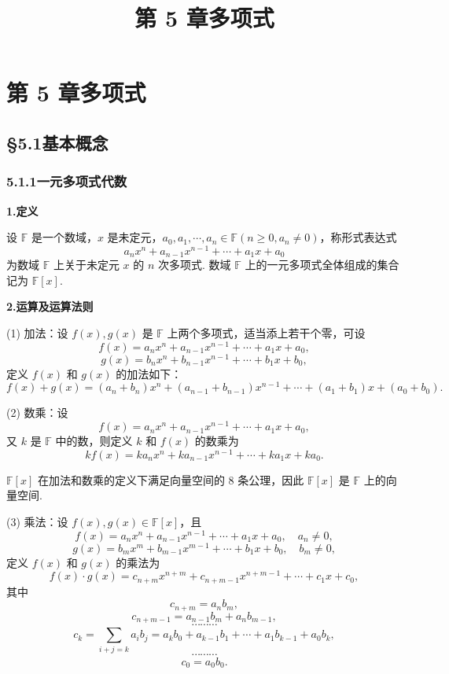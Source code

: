\documentclass[UTF8, 12pt, fontset=fandol, oneside]{ctexart}
\title{第 5 章\quad 多项式}
\author{}
\date{}
\begin{document}
\maketitle

\section*{第 5 章\quad 多项式}

\subsection*{§5.1\quad 基本概念}

\subsubsection*{5.1.1\quad 一元多项式代数}

\noindent\textbf{1.\quad 定义}

设 $\mathbb{F}$ 是一个数域，$x$ 是未定元，$a_0,a_1,\cdots,a_n\in\mathbb{F}(n\ge 0,a_n\ne0)$，称形式表达式
\[
a_nx^n+a_{n-1}x^{n-1}+\cdots+a_1x+a_0
\]
为数域 $\mathbb{F}$ 上关于未定元 $x$ 的 $n$ 次多项式. 数域 $\mathbb{F}$ 上的一元多项式全体组成的集合记为 $\mathbb{F}[x]$.

\noindent\textbf{2.\quad 运算及运算法则}

(1) 加法：设 $f(x),g(x)$ 是 $\mathbb{F}$ 上两个多项式，适当添上若干个零，可设
\[
f(x)=a_nx^n+a_{n-1}x^{n-1}+\cdots+a_1x+a_0,
\]
\[
g(x)=b_nx^n+b_{n-1}x^{n-1}+\cdots+b_1x+b_0,
\]
定义 $f(x)$ 和 $g(x)$ 的加法如下：
\[
f(x)+g(x)=(a_n+b_n)x^n+(a_{n-1}+b_{n-1})x^{n-1}
+\cdots+(a_1+b_1)x+(a_0+b_0).
\]

(2) 数乘：设
\[
f(x)=a_nx^n+a_{n-1}x^{n-1}+\cdots+a_1x+a_0,
\]
又 $k$ 是 $\mathbb{F}$ 中的数，则定义 $k$ 和 $f(x)$ 的数乘为
\[
kf(x)=ka_nx^n+ka_{n-1}x^{n-1}+\cdots+ka_1x+ka_0.
\]

$\mathbb{F}[x]$ 在加法和数乘的定义下满足向量空间的 8 条公理，因此 $\mathbb{F}[x]$ 是 $\mathbb{F}$ 上的向量空间.

(3) 乘法：设 $f(x),g(x)\in\mathbb{F}[x]$，且
\[
f(x)=a_nx^n+a_{n-1}x^{n-1}+\cdots+a_1x+a_0,\quad a_n\ne0,
\]
\[
g(x)=b_mx^m+b_{m-1}x^{m-1}+\cdots+b_1x+b_0,\quad b_m\ne0,
\]
定义 $f(x)$ 和 $g(x)$ 的乘法为
\[
f(x)\cdot g(x)=c_{n+m}x^{n+m}+c_{n+m-1}x^{n+m-1}+\cdots+c_1x+c_0,
\]
其中
\[
c_{n+m}=a_nb_m,
\]
\[
c_{n+m-1}=a_{n-1}b_m+a_nb_{m-1},
\]
\[
\cdots\cdots\cdots
\]
\[
c_k=\sum_{i+j=k}a_ib_j=a_kb_0+a_{k-1}b_1+\cdots+a_1b_{k-1}+a_0b_k,
\]
\[
\cdots\cdots\cdots
\]
\[
c_0=a_0b_0.
\]
\end{document}
